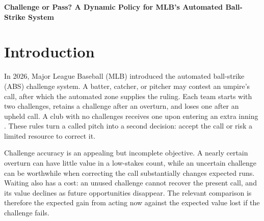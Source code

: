\documentclass[12pt,letterpaper]{article}
\begin{document}
\begin{center}
  {\LARGE\bfseries Challenge or Pass? A Dynamic Policy for MLB's
  Automated Ball-Strike System\par}
\end{center}
\vspace{0.5em}

\begin{abstract}
Major League Baseball's automated ball-strike challenge system requires teams
to decide whether an uncertain correction is worth risking scarce future
inventory. We combine role-specific models of observed challenge
behavior, empirical pitch-margin distributions by count, and run expectancy in
a dynamic decision rule. We train the policy on games before July 20 and
evaluate it on \ConfirmationGames{} later ABS games.
On this held-out opportunity clock, the learned policy captures
\LearnedREPerGame{} modeled run expectancy (RE) per game, compared with
\ObservedREPerGame{} under observed decisions: a gain of \GainREPerGame{} RE
per game (whole-game fixed-policy 95\% interval
\GainLowerPerGame{}--\GainUpperPerGame{}). Its
model-implied overturn rate is \LearnedSuccessRate{}, compared with
\ObservedSuccessRate{} under observed decisions. The policy challenges more
often when the immediate stake is large and future inventory is less valuable.
A strong ABS policy maximizes expected run value by spending uncertain
challenges where a correction matters most.
\end{abstract}

\section{Introduction}

In 2026, Major League Baseball (MLB) introduced the automated ball-strike
(ABS) challenge system. A batter, catcher, or pitcher may contest an umpire's
call, after which the automated zone supplies the ruling. Each team starts
with two challenges, retains a challenge after an overturn, and loses one
after an upheld call. A club with no challenges receives one upon entering an
extra inning \citep{mlb2025absrules}. These rules turn a called pitch into a
second decision: accept the call or risk a limited resource to correct it.

Challenge accuracy is an appealing but incomplete objective. A nearly certain
overturn can have little value in a low-stakes count, while an uncertain
challenge can be worthwhile when correcting the call substantially changes
expected runs. Waiting also has a cost: an unused challenge cannot recover the
present call, and its value declines as future opportunities disappear. The
relevant comparison is therefore the expected gain from acting now against
the expected value lost if the challenge fails.
\end{document}
